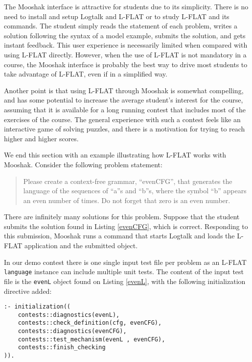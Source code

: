 \documentclass{llncs}
\begin{document}
The Mooshak interface is attractive for students due to its simplicity. There is no need to install and setup Logtalk and L-FLAT or to study L-FLAT and its commands. The student simply reads the statement of each problem, writes a solution following the syntax of a model example, submits the solution, and gets instant feedback. This user experience is necessarily limited when compared with using L-FLAT directly. However, when the use of L-FLAT is not mandatory in a course, the Mooshak interface is probably the best way to drive most students to take advantage of L-FLAT, even if in a simplified way.

Another point is that using L-FLAT through Mooshak is somewhat compelling, and has some potential to increase the average student's interest for the course, assuming that it is available for a long running contest that includes most of the exercises of the course. The general experience with such a contest feels like an interactive game of solving puzzles, and there is a motivation for trying to reach higher and higher scores.



We end this section with an example illustrating how L-FLAT works with Mooshak. Consider the following problem statement:

\begin{quote}
Please create a context-free grammar, ``evenCFG'', that generates the language of the sequences of ``a''s and ``b''s, where the symbol ``b'' appears an even number of times. Do not forget that zero is an even number.
\end{quote}

\noindent
There are infinitely many solutions for this problem. Suppose that the student submits the solution found in Listing \ref{evenCFG}, which is correct. Responding to this submission, Mooshak runs a command that starts Logtalk and loads the L-FLAT application and the submitted object.

In our demo contest there is one single input test file per problem as an L-FLAT \lstinline{language} instance can include multiple unit tests. The content of the input test file is the \lstinline{evenL} object found on Listing \ref{evenL}, with the following initialization directive added:

\begin{lstlisting}[caption={\lstinline{evenL} language initialization for testing the \lstinline{evenCFG} mechanism}, label=initialization]
:- initialization((
    contests::diagnostics(evenL),
    contests::check_definition(cfg, evenCFG),
    contests::diagnostics(evenCFG),
    contests::test_mechanism(evenL , evenCFG),
    contests::finish_checking
)).
\end{lstlisting}
\end{document}
